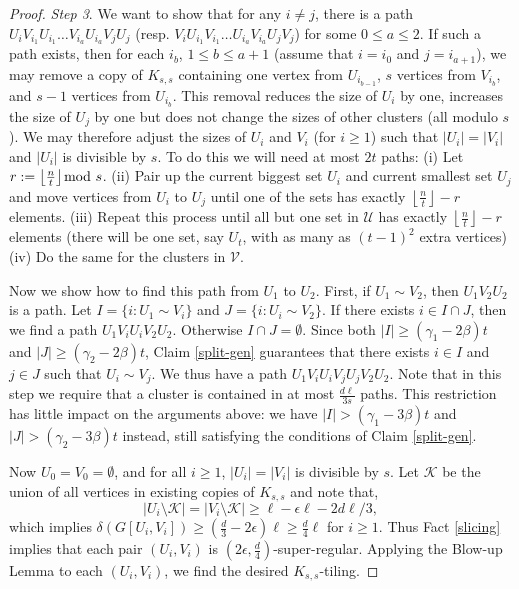 \documentclass[oneside,12pt]{memoir}
\newcommand{\ep}{\epsilon}
\newcommand{\floor}[1]{\left\lfloor#1\right\rfloor}
\begin{document}
\begin{proof}
\emph{Step 3}. We want to show that for any $i \neq j$, there is a path $U_iV_{i_1}U_{i_1}\dots V_{i_a}U_{i_a}V_jU_j$ (resp. $V_iU_{i_1}V_{i_1}\dots U_{i_a}V_{i_a}U_jV_j$) for some $0\leq a\leq 2$. If such a path exists, then for each $i_b$, $1\leq b\leq a+1$ (assume that $i = i_0$ and $j = i_{a+1}$), we may remove a copy of $K_{s,s}$ containing one vertex from $U_{i_{b-1}}$, $s$ vertices
from $V_{i_b}$, and $s-1$ vertices from $U_{i_b}$. This removal reduces the size of $U_i$ by one, increases
the size of $U_j$ by one but does not change the sizes of other clusters (all modulo $s$). We may
therefore adjust the sizes of $U_i$ and $V_i$ (for $i \geq 1$) such that $|U_i|=|V_i|$ and $|U_i|$ is divisible
by $s$.  To do this we will need at most $2t$ paths: (i) Let $r:=\floor{\frac{n}{t}}\hspace{-.1in}\mod s$. (ii) Pair up the current biggest set $U_i$ and current smallest set $U_j$ and move vertices from $U_i$ to $U_j$ until one of the sets has exactly $\floor{\frac{n}{t}}-r$ elements. (iii) Repeat this process until all but one set in $\mathcal{U}$ has exactly $\floor{\frac{n}{t}}-r$ elements (there will be one set, say $U_t$, with as many as $(t-1)^2$ extra vertices) (iv) Do the same for the clusters in $\mathcal{V}$.  

Now we show how to find this path from $U_1$ to $U_2$.  First, if $U_1\sim V_2$, then $U_1V_2U_2$
is a path. Let $I = \{i : U_1 \sim V_i\}$ and $J = \{i : U_i\sim V_2\}$. If there exists $i \in I \cap J$, then
we find a path $U_1V_iU_iV_2U_2$. Otherwise $I \cap J = \emptyset$. Since both $|I|\geq (\gamma_1-2\beta)t$ and $|J|\geq (\gamma_2-2\beta)t$, Claim \ref{split-gen} guarantees that there exists $i\in I$ and $j\in J$ such that $U_i\sim V_j$. We thus have a path $U_1V_iU_iV_jU_jV_2U_2$. Note that in this step we require that a cluster is contained in at most $\frac{d\ell}{3s}$ paths. This restriction has little impact
on the arguments above: we have $|I|>(\gamma_1-3\beta)t$ and $|J| > (\gamma_2-3\beta)t$ instead, still satisfying the conditions
of Claim \ref{split-gen}.  

Now $U_0=V_0=\emptyset$, and for all $i \geq 1$, $|U_i|=|V_i|$ is divisible by $s$.  Let $\mathcal{K}$ be the union of all vertices in existing copies of $K_{s,s}$ and note that, 
\begin{equation*}%
|U_i\setminus \mathcal{K}|=|V_i\setminus \mathcal{K}|\geq \ell-\ep \ell-2d\ell/3,
\end{equation*} 
which implies $\delta(G[U_i, V_i])\geq (\frac{d}{3}-2\ep)\ell\geq \frac{d}{4}\ell$ for $i\geq 1$.  Thus Fact \ref{slicing} implies that each pair $(U_i, V_i)$ is $(2\ep, \frac{d}{4})$-super-regular.  Applying the Blow-up Lemma to each $(U_i, V_i)$, we find the desired $K_{s,s}$-tiling.

\end{proof}
\end{document}
